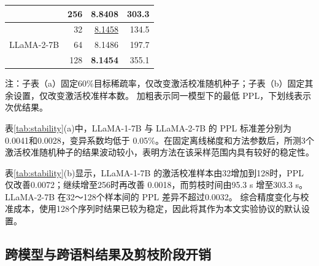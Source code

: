 \documentclass[UTF8,fontset=fandol]{ctexart}
\newcommand{\best}[1]{\textbf{#1}}
\newcommand{\second}[1]{\underline{#1}}
\begin{document}
\begin{table}[!htbp]
\begin{minipage}{0.49\textwidth}
\begin{tabular}{lrrr}
 & 256 & \best{8.8408} & 303.3 \\
\midrule
\multirow{3}{*}{LLaMA-2-7B}
 & 32  & \second{8.1458} & 134.5 \\
 & 64  & 8.1486 & 197.7 \\
 & 128 & \best{8.1454} & 355.1 \\
\bottomrule
\end{tabular}
\end{minipage}
\vspace{2pt}
\parbox{0.96\textwidth}{\scriptsize
注：子表（a）固定60\%目标稀疏率，仅改变激活校准随机种子；子表（b）固定其余设置，仅改变激活校准样本数。
加粗表示同一模型下的最低 PPL，下划线表示次优结果。}
\end{table}

表\ref{tab:stability}(a)中，LLaMA-1-7B 与 LLaMA-2-7B 的 PPL 标准差分别为0.0041和0.0028，变异系数均低于
0.05\%。在固定离线梯度和方法参数后，所测3个激活校准随机种子的结果波动较小，表明方法在该采样范围内具有较好的稳定性。

表\ref{tab:stability}(b)显示，LLaMA-1-7B 的激活校准样本由32增加到128时，PPL 仅改善0.0072；继续增至256时再改善
0.0018，而剪枝时间由95.3 s 增至303.3 s。LLaMA-2-7B 在32～128个样本间的 PPL 差异不超过0.0032。
综合精度变化与校准成本，使用128个序列时结果已较为稳定，因此将其作为本文实验协议的默认设置。

\FloatBarrier
\subsection{跨模型与跨语料结果及剪枝阶段开销}
\end{document}
